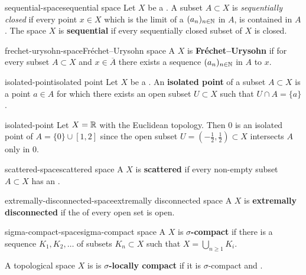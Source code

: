 \begin{topic}{sequential-space}{sequential space}
    Let $X$ be a . A subset $A \subset X$ is \textit{sequentially closed} if every point $x \in X$ which is the limit of a  $(a_n)_{n \in \mathbb{N}}$ in $A$, is contained in $A$. The space $X$ is \textbf{sequential} if every sequentially closed subset of $X$ is closed.
\end{topic}

\begin{topic}{frechet-urysohn-space}{Fréchet--Urysohn space}
    A  $X$ is \textbf{Fréchet--Urysohn} if for every subset $A \subset X$ and $x \in \overline{A}$ there exists a sequence $(a_n)_{n \in \mathbb{N}}$ in $A$  to $x$.
\end{topic}

\begin{topic}{isolated-point}{isolated point}
    Let $X$ be a . An \textbf{isolated point} of a subset $A \subset X$ is a point $a \in A$ for which there exists an open subset $U \subset X$ such that $U \cap A = \{ a \}$.
\end{topic}

\begin{example}{isolated-point}
    Let $X = \mathbb{R}$ with the Euclidean topology. Then $0$ is an isolated point of $A = \{ 0 \} \cup [1, 2]$ since the open subset $U = (-\tfrac{1}{2}, \tfrac{1}{2}) \subset X$ intersects $A$ only in $0$.
\end{example}

\begin{topic}{scattered-space}{scattered space}
    A  $X$ is \textbf{scattered} if every non-empty subset $A \subset X$ has an .
\end{topic}

\begin{topic}{extremally-disconnected-space}{extremally disconnected space}
    A  $X$ is \textbf{extremally disconnected} if the  of every open set is open.
\end{topic}

\begin{topic}{sigma-compact-space}{sigma-compact space}
    A  $X$ is \textbf{$\sigma$-compact} if there is a sequence $K_1, K_2, \ldots$ of  subsets $K_n \subset X$ such that $X = \bigcup_{n \ge 1} K_i$.
    
    A topological space $X$ is is \textbf{$\sigma$-locally compact} if it is $\sigma$-compact and .
\end{topic}

